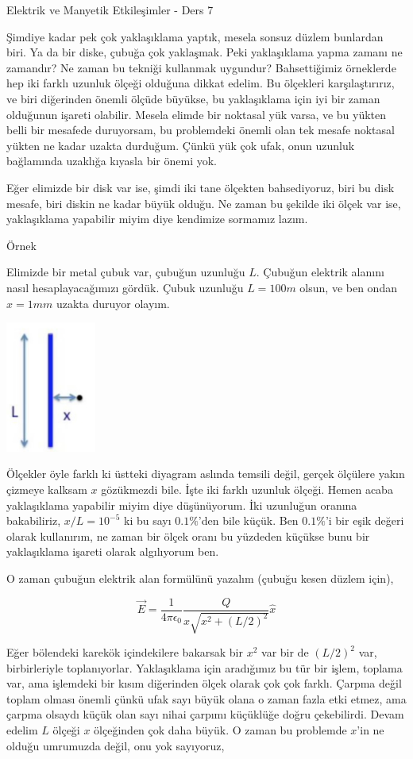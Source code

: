 \documentclass[12pt,fleqn]{article}\usepackage{../../common}
\begin{document}
Elektrik ve Manyetik Etkileşimler - Ders 7

Şimdiye kadar pek çok yaklaşıklama yaptık, mesela sonsuz düzlem bunlardan
biri. Ya da bir diske, çubuğa çok yaklaşmak. Peki yaklaşıklama yapma zamanı ne
zamandır? Ne zaman bu tekniği kullanmak uygundur? Bahsettiğimiz örneklerde hep
iki farklı uzunluk ölçeği olduğuna dikkat edelim. Bu ölçekleri karşılaştırırız,
ve biri diğerinden önemli ölçüde büyükse, bu yaklaşıklama için iyi bir zaman
olduğunun işareti olabilir. Mesela elimde bir noktasal yük varsa, ve bu yükten
belli bir mesafede duruyorsam, bu problemdeki önemli olan tek mesafe noktasal
yükten ne kadar uzakta durduğum.  Çünkü yük çok ufak, onun uzunluk bağlamında
uzaklığa kıyasla bir önemi yok.

Eğer elimizde bir disk var ise, şimdi iki tane ölçekten bahsediyoruz, biri bu
disk mesafe, biri diskin ne kadar büyük olduğu. Ne zaman bu şekilde iki ölçek
var ise, yaklaşıklama yapabilir miyim diye kendimize sormamız lazım. 

Örnek

Elimizde bir metal çubuk var, çubuğun uzunluğu $L$. Çubuğun elektrik alanını
nasıl hesaplayacağımızı gördük. Çubuk uzunluğu $L=100m$ olsun, ve ben ondan $x=1
mm$ uzakta duruyor olayım. 

\includegraphics[width=8em]{07_01.jpg}

Ölçekler öyle farklı ki üstteki diyagram aslında temsili değil, gerçek ölçülere
yakın çizmeye kalksam $x$ gözükmezdi bile. İşte iki farklı uzunluk ölçeği.
Hemen acaba yaklaşıklama yapabilir miyim diye düşünüyorum. İki uzunluğun oranına
bakabiliriz, $x/L = 10^{-5}$ ki bu sayı $0.1\%$'den bile küçük. Ben $0.1\%$'i
bir eşik değeri olarak kullanırım, ne zaman bir ölçek oranı bu yüzdeden küçükse
bunu bir yaklaşıklama işareti olarak algılıyorum ben.

O zaman çubuğun elektrik alan formülünü yazalım (çubuğu kesen düzlem için),

$$
\vec{E} = \frac{1}{4\pi\epsilon_0} \frac{Q}{x \sqrt{x^2 + (L/2)^2}} \hat{x}
$$

Eğer bölendeki karekök içindekilere bakarsak bir $x^2$ var bir de $(L/2)^2$ var,
birbirleriyle toplanıyorlar. Yaklaşıklama için aradığımız bu tür bir işlem,
toplama var, ama işlemdeki bir kısım diğerinden ölçek olarak çok çok
farklı. Çarpma değil toplam olması önemli çünkü ufak sayı büyük olana o zaman
fazla etki etmez, ama çarpma olsaydı küçük olan sayı nihai çarpımı küçüklüğe
doğru çekebilirdi. Devam edelim $L$ ölçeği $x$ ölçeğinden çok daha büyük. O
zaman bu problemde $x$'in ne olduğu umrumuzda değil, onu yok sayıyoruz,
\end{document}
